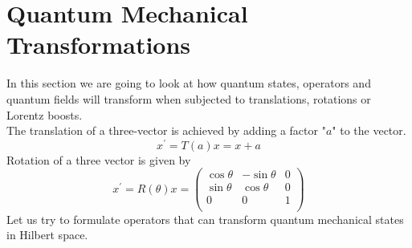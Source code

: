 \section{Quantum Mechanical Transformations}
In this section we are going to look at how quantum states, operators and quantum fields will transform when subjected to translations, rotations or Lorentz boosts.  \\
The translation of a three-vector is achieved by adding a factor "$a$" to the vector. 
\begin{equation}
    x^{'} = T(a)x = x+a
\end{equation}
Rotation of a three vector is given by 
\begin{equation}
x^{'} = R(\theta)x =  \begin{pmatrix}
\cos \theta & -\sin \theta & 0\\
\sin \theta & \cos \theta & 0 \\
0 & 0 & 1  \\
\end{pmatrix}
\end{equation}
Let us try to formulate operators that can transform quantum mechanical states in Hilbert space. 
